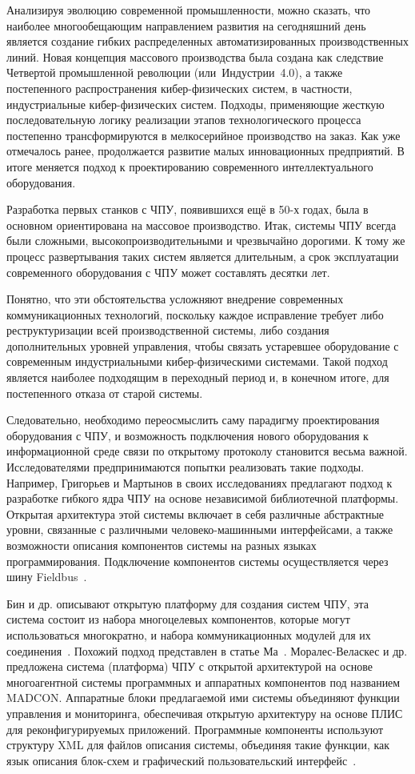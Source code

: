Анализируя эволюцию современной промышленности, можно сказать, что наиболее многообещающим направлением развития на сегодняшний день является создание гибких распределенных автоматизированных производственных линий. Новая концепция массового производства была создана как следствие Четвертой промышленной революции (или~Индустрии~4.0), а также постепенного распространения кибер-физических систем, в частности, индустриальные кибер-физических систем.
Подходы, применяющие жесткую последовательную логику реализации этапов технологического процесса постепенно трансформируются в мелкосерийное производство на заказ. Как уже отмечалось ранее, продолжается развитие малых инновационных предприятий. В итоге меняется подход к проектированию современного интеллектуального оборудования.

Разработка первых станков с ЧПУ, появившихся ещё в 50-х годах, была в основном ориентирована на массовое производство. Итак, системы ЧПУ всегда были сложными, высокопроизводительными и чрезвычайно дорогими. К тому же процесс развертывания таких систем является длительным, а срок эксплуатации современного оборудования с ЧПУ может составлять десятки лет.

Понятно, что эти обстоятельства усложняют внедрение современных коммуникационных технологий, поскольку каждое исправление требует либо реструктуризации всей производственной системы, либо создания дополнительных уровней управления, чтобы связать устаревшее оборудование с современным индустриальными кибер-физическими системами. Такой подход является наиболее подходящим в переходный период и, в конечном итоге, для постепенного отказа от старой системы.

Следовательно, необходимо переосмыслить саму парадигму проектирования оборудования с ЧПУ, и возможность подключения нового оборудования к информационной среде связи по открытому протоколу становится весьма важной.
Исследователями предпринимаются попытки реализовать такие подходы. Например, Григорьев и Мартынов в своих исследованиях предлагают подход к разработке гибкого ядра ЧПУ на основе независимой библиотечной платформы. Открытая архитектура этой системы включает в себя различные абстрактные уровни, связанные с различными человеко-машинными интерфейсами, а также возможности описания компонентов системы на разных языках программирования. Подключение компонентов системы осуществляется через шину Fieldbus~\cite{Grigoriev2014517}.

Бин и др. описывают открытую платформу для создания систем ЧПУ, эта система состоит из набора многоцелевых компонентов, которые могут использоваться многократно, и набора коммуникационных модулей для их соединения~\cite {Bin200473}. Похожий подход представлен в статье Ма~\cite{MA2007272}.
Моралес-Веласкес и др. предложена система (платформа) ЧПУ с открытой архитектурой на основе многоагентной системы программных и аппаратных компонентов под названием MADCON. Аппаратные блоки предлагаемой ими системы объединяют функции управления и мониторинга, обеспечивая открытую архитектуру на основе ПЛИС для реконфигурируемых приложений. Программные компоненты используют структуру XML для файлов описания системы, объединяя такие функции, как язык описания блок-схем и графический пользовательский интерфейс~\cite{MoralesVelazquez2010407}.

